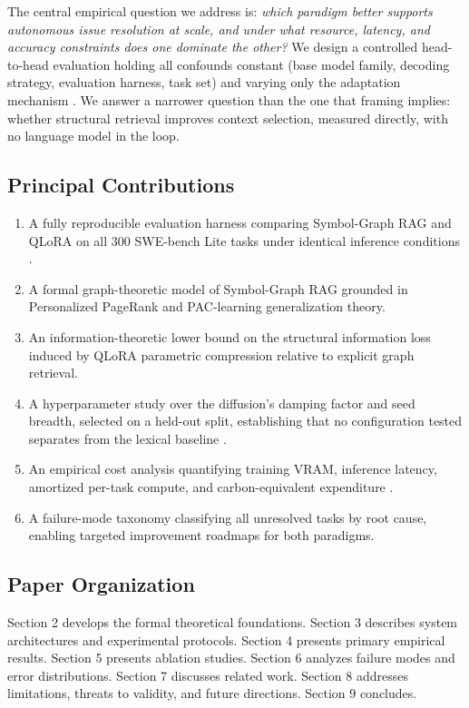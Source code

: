 \documentclass[10pt,journal,compsoc,twocolumn]{IEEEtran}
\begin{document}
The central empirical question we address is: \textit{which paradigm better supports autonomous issue resolution at scale, and under what resource, latency, and accuracy constraints does one dominate the other?} We design a controlled head-to-head evaluation holding all confounds constant (base model family, decoding strategy, evaluation harness, task set) and varying only the adaptation mechanism \cite{arxiv_2203_11171}. We answer a narrower question than the one that framing implies: whether structural retrieval improves context selection, measured directly, with no language model in the loop.


\subsection{Principal Contributions}


\begin{enumerate}
  \item A fully reproducible evaluation harness comparing Symbol-Graph RAG and QLoRA on all 300 SWE-bench Lite tasks under identical inference conditions \cite{arxiv_2405_01543}.
  \item A formal graph-theoretic model of Symbol-Graph RAG grounded in Personalized PageRank and PAC-learning generalization theory.
  \item An information-theoretic lower bound on the structural information loss induced by QLoRA parametric compression relative to explicit graph retrieval.
  \item A hyperparameter study over the diffusion's damping factor and seed breadth, selected on a held-out split, establishing that no configuration tested separates from the lexical baseline \cite{arxiv_2308_12898}.
  \item An empirical cost analysis quantifying training VRAM, inference latency, amortized per-task compute, and carbon-equivalent expenditure \cite{arxiv_2406_00584}.
  \item A failure-mode taxonomy classifying all unresolved tasks by root cause, enabling targeted improvement roadmaps for both paradigms.
\end{enumerate}


\subsection{Paper Organization}


Section 2 develops the formal theoretical foundations. Section 3 describes system architectures and experimental protocols. Section 4 presents primary empirical results. Section 5 presents ablation studies. Section 6 analyzes failure modes and error distributions. Section 7 discusses related work. Section 8 addresses limitations, threats to validity, and future directions. Section 9 concludes.
\end{document}
